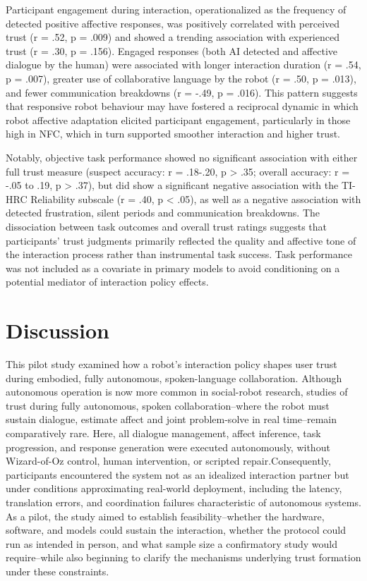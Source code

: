 \documentclass[
  authoryear,
  doubleblind,
  3p]{elsarticle}
\begin{document}
Participant engagement during interaction, operationalized as the
frequency of detected positive affective responses, was positively
correlated with perceived trust (r = .52, p = .009) and showed a
trending association with experienced trust (r = .30, p = .156). Engaged
responses (both AI detected and affective dialogue by the human) were
associated with longer interaction duration (r = .54, p = .007), greater
use of collaborative language by the robot (r = .50, p = .013), and
fewer communication breakdowns (r = -.49, p = .016). This pattern
suggests that responsive robot behaviour may have fostered a reciprocal
dynamic in which robot affective adaptation elicited participant
engagement, particularly in those high in NFC, which in turn supported
smoother interaction and higher trust.

Notably, objective task performance showed no significant association
with either full trust measure (suspect accuracy: r = .18-.20, p
\textgreater{} .35; overall accuracy: r = -.05 to .19, p \textgreater{}
.37), but did show a significant negative association with the TI-HRC
Reliability subscale (r = .40, p \textless{} .05), as well as a negative
association with detected frustration, silent periods and communication
breakdowns. The dissociation between task outcomes and overall trust
ratings suggests that participants' trust judgments primarily reflected
the quality and affective tone of the interaction process rather than
instrumental task success. Task performance was not included as a
covariate in primary models to avoid conditioning on a potential
mediator of interaction policy effects.

\section{Discussion}\label{discussion}

This pilot study examined how a robot's interaction policy shapes user
trust during embodied, fully autonomous, spoken-language collaboration.
Although autonomous operation is now more common in social-robot
research, studies of trust during fully autonomous, spoken
collaboration--where the robot must sustain dialogue, estimate affect
and joint problem-solve in real time--remain comparatively rare. Here,
all dialogue management, affect inference, task progression, and
response generation were executed autonomously, without Wizard-of-Oz
control, human intervention, or scripted repair.Consequently,
participants encountered the system not as an idealized interaction
partner but under conditions approximating real-world deployment,
including the latency, translation errors, and coordination failures
characteristic of autonomous systems. As a pilot, the study aimed to
establish feasibility--whether the hardware, software, and models could
sustain the interaction, whether the protocol could run as intended in
person, and what sample size a confirmatory study would require--while
also beginning to clarify the mechanisms underlying trust formation
under these constraints.
\end{document}
